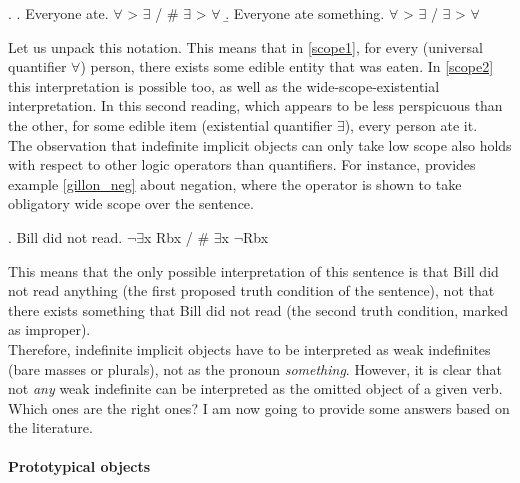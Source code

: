\ex. \label{scope} \a. \label{scope1} Everyone ate. \hfill $\forall$ > $\exists$ / \# $\exists$ > $\forall$
\b. \label{scope2} Everyone ate something. \hfill $\forall$ > $\exists$ / $\exists$ > $\forall$

Let us unpack this notation. This means that in \ref{scope1}, for every (universal quantifier $\forall$) person, there exists some edible entity that was eaten. In \ref{scope2} this interpretation is possible too, as well as the wide-scope-existential interpretation. In this second reading, which appears to be less perspicuous than the other, for some edible item (existential quantifier $\exists$), every person ate it.\\
The observation that indefinite implicit objects can only take low scope also holds with respect to other logic operators than quantifiers. For instance, \textcite[316]{Gillon2012} provides example \ref{gillon_neg} about negation, where the operator is shown to take obligatory wide scope over the sentence.

\ex. \label{gillon_neg} Bill did not read. \hfill $\neg \exists$x Rbx / \# $\exists$x $\neg$Rbx

This means that the only possible interpretation of this sentence is that Bill did not read anything (the first proposed truth condition of the sentence), not that there exists something that Bill did not read (the second truth condition, marked as improper).\\
Therefore, indefinite implicit objects have to be interpreted as weak indefinites (bare masses or plurals), not as the pronoun \textit{something}. However, it is clear that not \textit{any} weak indefinite can be interpreted as the omitted object of a given verb. Which ones are the right ones? I am now going to provide some answers based on the literature.

\paragraph{Prototypical objects}

